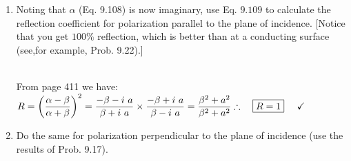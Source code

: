 \documentclass[fleqn]{article}
\begin{document}
\begin{enumerate}
\begin{enumerate}
      \item Noting that $\alpha$ (Eq. 9.108) is now imaginary, use Eq. $9.109$ to calculate the reflection coefficient for polarization 
      parallel to the plane of incidence. [Notice that you get $100\%$ reflection, which is better than at a conducting 
      surface (see,for example, Prob. 9.22).]

        \textcolor{hwColor}{
          \\
          From page 411 we have:
          \\
          $
            R=\left(\dfrac{\alpha-\beta}{\alpha+\beta}\right)^2
            =\dfrac{-\beta-i ~ a }{\beta+i ~ a} \times \dfrac{-\beta+i ~ a}{\beta-i ~ a}
            =\dfrac{\beta^2+a^2}{\beta^2+a^2}
            \\
            \\
            \\
            \therefore ~~~ \boxed{
              R=1
            } ~~~~ \checkmark
          $
        }

      \pagebreak

      \item Do the same for polarization perpendicular to the plane of incidence (use the
      results of Prob. 9.17).


\end{enumerate}
\end{enumerate}
\end{document}
